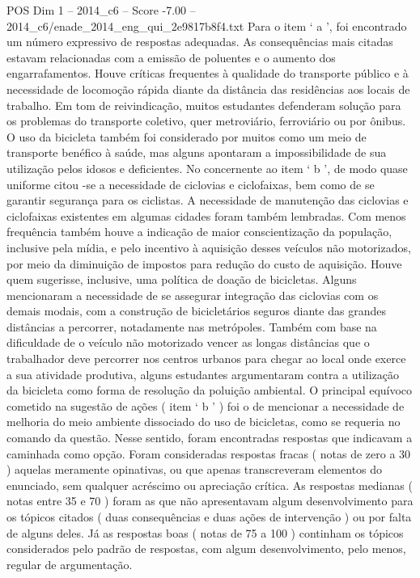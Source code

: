 \begin{textsample}{POS Dim 1 – 2014\_c6 – Score -7.00 – 2014\_c6/enade\_2014\_eng\_qui\_2e9817b8f4.txt}
Para o item ‘ a ’, foi encontrado um número expressivo de respostas adequadas.
As consequências mais citadas estavam relacionadas com a emissão de poluentes e o aumento dos engarrafamentos.
Houve críticas frequentes à qualidade do transporte público e à necessidade de locomoção rápida diante da distância das residências aos locais de trabalho.
Em tom de reivindicação, muitos estudantes defenderam solução para os problemas do transporte coletivo, quer metroviário, ferroviário ou por ônibus.
O uso da bicicleta também foi considerado por muitos como um meio de transporte benéfico à saúde, mas alguns apontaram a impossibilidade de sua utilização pelos idosos e deficientes.
No concernente ao item ‘ b ’, de modo quase uniforme citou -se a necessidade de ciclovias e ciclofaixas, bem como de se garantir segurança para os ciclistas.
A necessidade de manutenção das ciclovias e ciclofaixas existentes em algumas cidades foram também lembradas.
Com menos frequência também houve a indicação de maior conscientização da população, inclusive pela mídia, e pelo incentivo à aquisição desses veículos não motorizados, por meio da diminuição de impostos para redução do custo de aquisição.
Houve quem sugerisse, inclusive, uma política de doação de bicicletas.
Alguns mencionaram a necessidade de se assegurar integração das ciclovias com os demais modais, com a construção de bicicletários seguros diante das grandes distâncias a percorrer, notadamente nas metrópoles.
Também com base na dificuldade de o veículo não motorizado vencer as longas distâncias que o trabalhador deve percorrer nos centros urbanos para chegar ao local onde exerce a sua atividade produtiva, alguns estudantes argumentaram contra a utilização da bicicleta como forma de resolução da poluição ambiental.
O principal equívoco cometido na sugestão de ações ( item ‘ b ’ ) foi o de mencionar a necessidade de melhoria do meio ambiente dissociado do uso de bicicletas, como se requeria no comando da questão.
Nesse sentido, foram encontradas respostas que indicavam a caminhada como opção.
Foram consideradas respostas fracas ( notas de zero a 30 ) aquelas meramente opinativas, ou que apenas transcreveram elementos do enunciado, sem qualquer acréscimo ou apreciação crítica.
As respostas medianas ( notas entre 35 e 70 ) foram as que não apresentavam algum desenvolvimento para os tópicos citados ( duas consequências e duas ações de intervenção ) ou por falta de alguns deles.
Já as respostas boas ( notas de 75 a 100 ) continham os tópicos considerados pelo padrão de respostas, com algum desenvolvimento, pelo menos, regular de argumentação.

\end{textsample}
